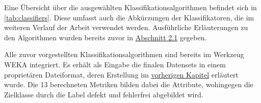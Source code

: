 Eine Übersicht über die ausgewählten Klassifikationsalgorithmen befindet sich in \autoref{tab:classifiers}. Diese umfasst auch die Abkürzungen der Klassifikatoren, die im weiteren Verlauf der Arbeit verwendet werden. Ausführliche Erläuterungen zu den Algorithmen wurden bereits zuvor in \hyperref[algorithms]{Abschnitt 2.1} gegeben.

\begin{table}[ht]
\centering
\caption{Zum Training verwendete Klassifikationsalgorithmen}
\label{tab:classifiers}
\end{table}

Alle zuvor vorgestellten Klassifikationsalgorithmen sind bereits im Werkzeug WEKA integriert. Es erhält als Eingabe die finalen Datensets in einem proprietären Dateiformat, deren Erstellung im \hyperref[dataset-creation]{vorherigen Kapitel} erläutert wurde. Die 13 berechneten Metriken bilden dabei die Attribute, wohingegen die Zielklasse durch die Label \glqq defekt\grqq{} und \glqq fehlerfrei\grqq{} abgebildet wird.


